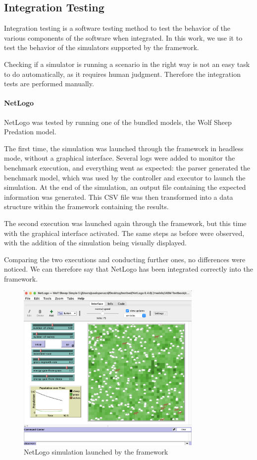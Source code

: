 \documentclass[12pt,a4paper,openright,twoside]{book}
\begin{document}
\subsection*{Integration Testing}

Integration testing is a software testing method to test the behavior of the various components of the software when integrated.
In this work, we use it to test the behavior of the simulators supported by the framework.

Checking if a simulator is running a scenario in the right way is not an easy task to do automatically, as it requires human judgment.
Therefore the integration tests are performed manually.

\paragraph*{NetLogo}
NetLogo was tested by running one of the bundled models, the Wolf Sheep Predation model.

The first time, the simulation was launched through the framework in headless mode, without a graphical interface.
Several logs were added to monitor the benchmark execution, and everything went as expected:
the parser generated the benchmark model, which was used by the controller and executor to launch the simulation.
At the end of the simulation, an output file containing the expected information was generated.
This CSV file was then transformed into a data structure within the framework containing the results.

The second execution was launched again through the framework, but this time with the graphical interface activated. 
The same steps as before were observed, with the addition of the simulation being visually displayed.

Comparing the two executions and conducting further ones, no differences were noticed. 
We can therefore say that NetLogo has been integrated correctly into the framework.

\begin{figure}[H]
  \centering
  \includegraphics[width=0.8\textwidth]{figures/netlogo-sim.png}
  \caption{NetLogo simulation launched by the framework}
\end{figure}
\end{document}

